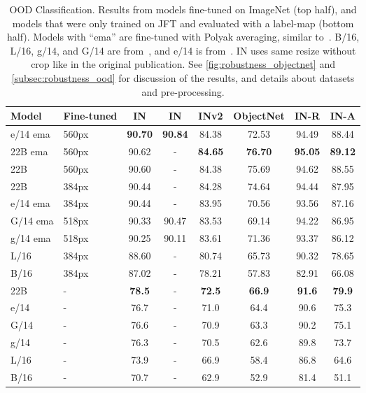 \documentclass{article}
\begin{document}
\begin{table}[th]
    \caption{
        OOD Classification. Results from models fine-tuned on ImageNet (top half), and models that were only trained on JFT and evaluated with a label-map (bottom half).
        Models with ``ema'' are fine-tuned with Polyak averaging, similar to~\citep{dosovitskiy2020image}.
        B/16, L/16, g/14, and G/14 are from~\citep{zhai2022scaling}, and e/14 is from~\citep{chen2022pali}.
        IN uses same resize without crop like in the original publication.
        See \cref{fig:robustness_objectnet} and \cref{subsec:robustness_ood} for discussion of the results, and details about datasets and pre-processing.
    }
    \centering
    \setlength{\tabcolsep}{5pt}
\begin{tabular}{@{} l l c c c c c c @{}}
        \toprule
Model & Fine-tuned & IN & IN & INv2 & ObjectNet & IN-R & IN-A \\
        \midrule
        e/14 ema & 560px &   \textbf{90.70} & \textbf{90.84} &  84.38 &     72.53 & 94.49 & 88.44 \\
        22B ema & 560px &   90.62 &              - &  \textbf{84.65} &     \textbf{76.70} & \textbf{95.05} & \textbf{89.12} \\
        22B & 560px &   90.60 & - &  84.38 &     75.69 & 94.62 & 88.55 \\
        22B & 384px &   90.44 & - &  84.28 &     74.64 & 94.44 & 87.95 \\
        e/14 ema & 384px &   90.44 & - &  83.95 &     70.56 & 93.56 & 87.16 \\
        G/14 ema & 518px &   90.33 & 90.47 &  83.53 &     69.14 & 94.22 & 86.95 \\
        g/14 ema & 518px &   90.25 & 90.11 &  83.61 &     71.36 & 93.37 & 86.12 \\
        L/16 & 384px &   88.60 & - &  80.74 &     65.73 & 90.32 & 78.65 \\
        B/16 & 384px &   87.02 & - &  78.21 &     57.83 & 82.91 & 66.08 \\
        \midrule
        22B & - &    \textbf{78.5} & - &   \textbf{72.5} &      \textbf{66.9} &  \textbf{91.6} &  \textbf{79.9} \\
        e/14 & - &    76.7 & - &   71.0 &      64.4 &  90.6 &  75.3 \\
        G/14 & - &    76.6 & - &   70.9 &      63.3 &  90.2 &  75.1 \\
        g/14 & - &    76.3 & - &   70.5 &      62.6 &  89.8 &  73.7 \\
        L/16 & - &    73.9 & - &   66.9 &      58.4 &  86.8 &  64.6 \\
        B/16 & - &    70.7 & - &   62.9 &      52.9 &  81.4 &  51.1 \\
        \bottomrule
    \end{tabular}
\label{tab:robustness_ood}
\end{table}
\end{document}
